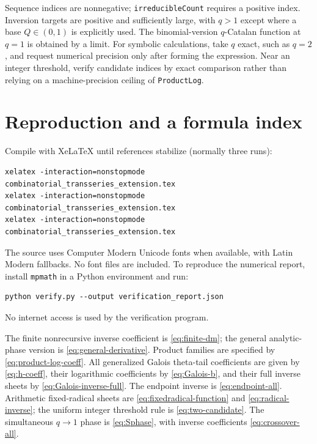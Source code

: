\documentclass[11pt]{article}
\numberwithin{equation}{section}
\theoremstyle{definition}
\begin{document}
Sequence indices are nonnegative; \texttt{irreducibleCount} requires a positive index. Inversion targets are positive and sufficiently large, with $q>1$ except where a base $Q\in(0,1)$ is explicitly used. The binomial-version $q$-Catalan function at $q=1$ is obtained by a limit. For symbolic calculations, take $q$ exact, such as $q=2$, and request numerical precision only after forming the expression. Near an integer threshold, verify candidate indices by exact comparison rather than relying on a machine-precision ceiling of \texttt{ProductLog}.

\section{Reproduction and a formula index}
\label{app:reproduce}

Compile with XeLaTeX until references stabilize (normally three runs):
\begin{lstlisting}
xelatex -interaction=nonstopmode combinatorial_transseries_extension.tex
xelatex -interaction=nonstopmode combinatorial_transseries_extension.tex
xelatex -interaction=nonstopmode combinatorial_transseries_extension.tex
\end{lstlisting}
The source uses Computer Modern Unicode fonts when available, with Latin Modern fallbacks. No font files are included. To reproduce the numerical report, install \texttt{mpmath} in a Python environment and run:
\begin{lstlisting}
python verify.py --output verification_report.json
\end{lstlisting}
No internet access is used by the verification program.

The finite nonrecursive inverse coefficient is \eqref{eq:finite-dm}; the general analytic-phase version is \eqref{eq:general-derivative}. Product families are specified by \eqref{eq:product-log-coeff}. All generalized Galois theta-tail coefficients are given by \eqref{eq:h-coeff}, their logarithmic coefficients by \eqref{eq:Galois-b}, and their full inverse sheets by \eqref{eq:Galois-inverse-full}. The endpoint inverse is \eqref{eq:endpoint-all}. Arithmetic fixed-radical sheets are \eqref{eq:fixedradical-function} and \eqref{eq:radical-inverse}; the uniform integer threshold rule is \eqref{eq:two-candidate}. The simultaneous $q\to1$ phase is \eqref{eq:Sphase}, with inverse coefficients \eqref{eq:crossover-all}.
\end{document}
